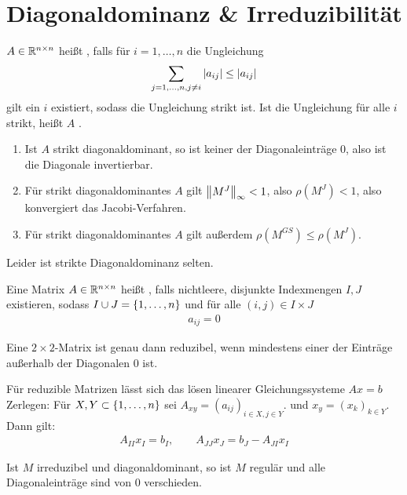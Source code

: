 \documentclass{report}
\begin{document}
	\section{Diagonaldominanz \& Irreduzibilität}
	\begin{definition}
		$A \in \mathbb{R}^{n \times n}$ heißt , falls für $i = 1, \hdots, n$ die Ungleichung
		\begin{align*}
			\sum_{j = 1, \hdots, n, j \neq i} \abs{a_{ij}} \leq \abs{a_{ij}}
		\end{align*}
		gilt
		 ein $i$ existiert, sodass die Ungleichung strikt ist. Ist die Ungleichung für alle $i$ strikt, heißt $A$ .
	\end{definition}
	\begin{corollary}
		\begin{enumerate}
			\item Ist $A$ strikt diagonaldominant, so ist keiner der Diagonaleinträge $0$, also ist die Diagonale invertierbar.
			\item Für strikt diagonaldominantes $A$ gilt $\norm{M^J}_\infty < 1$, also $\rho(M^J) < 1$, also konvergiert das Jacobi-Verfahren.
			\item Für strikt diagonaldominantes $A$ gilt außerdem $\rho(M^{GS}) \leq \rho(M^J)$.
		\end{enumerate}
	\end{corollary}
	Leider ist strikte Diagonaldominanz selten.
	\begin{definition}
		Eine Matrix $A \in \mathbb{R}^{n \times n}$ heißt , falls nichtleere, disjunkte Indexmengen $I,J$ existieren, sodass $I \cup J = \qty{1, \hdots, n}$ und für alle $(i,j) \in I \times J$
		\begin{align*}
			a_{ij} = 0
		\end{align*}
	\end{definition}
	\begin{example}
		Eine $2 \times 2$-Matrix ist genau dann reduzibel, wenn mindestens einer der Einträge außerhalb der Diagonalen $0$ ist.
	\end{example}
	\begin{proposition}
		Für reduzible Matrizen lässt sich das lösen linearer Gleichungssysteme $Ax = b$ Zerlegen: Für $X,Y \subset \qty{1, \hdots, n}$ sei $A_{xy} = (a_{ij})_{i \in X, j \in Y}$. und $x_y = (x_k)_{k \in Y}$. Dann gilt:
		\begin{align*}
			A_{II}x_I = b_I, \qquad A_{JJ}x_J = b_J - A_{JI}x_I
		\end{align*}
	\end{proposition}
	\begin{lemma}
		Ist $M$ irreduzibel und diagonaldominant, so ist $M$ regulär und alle Diagonaleinträge sind von $0$ verschieden.
	\end{lemma}
\end{document}
